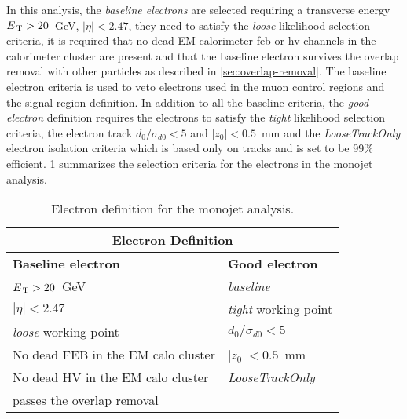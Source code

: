 In this analysis, the \emph{baseline electrons} are selected requiring a
transverse energy $E_\mathrm{\, T} > 20$~GeV, $|\eta| < 2.47$, they need to satisfy the
\emph{loose} likelihood selection criteria, it is required that no dead EM
calorimeter \gls{feb} or \gls{hv} channels in the calorimeter cluster are
present and that the baseline electron survives the overlap removal with other
particles as described in \cref{sec:overlap-removal}. The baseline electron
criteria is used to veto electrons used in the muon control regions and the
signal region definition. In addition to all the baseline criteria, the
\emph{good electron} definition requires the electrons to satisfy the
\emph{tight} likelihood selection criteria, the electron track
$d_0 / \sigma_{d0} < 5$ and $|z_0| < 0.5$~mm and the \emph{LooseTrackOnly}
electron isolation criteria which is based only on tracks and is set to be 99\%
efficient. \cref{tab:ele_def} summarizes the selection criteria for the
electrons in the monojet analysis.
\begin{table}[!th]
  \centering
  \begin{tabular}{ll}
    \toprule
    \multicolumn{2}{c}{Electron Definition} \\
    \midrule \midrule
    \textbf{Baseline electron} & \textbf{Good electron} \\
    \midrule
    $E_\mathrm{\, T} > 20$~GeV & \emph{baseline} \\
    $|\eta| < 2.47$ & \emph{tight} working point \\
    \emph{loose} working point & $d_0 / \sigma_{d0} < 5$ \\
    No dead FEB in the EM calo cluster & $|z_0| < 0.5$~mm \\
    No dead HV in the EM calo cluster & \emph{LooseTrackOnly} \\
    passes the overlap removal & \\
    \bottomrule
  \end{tabular}
  \caption{Electron definition for the monojet analysis.}
  \label{tab:ele_def}
\end{table}
